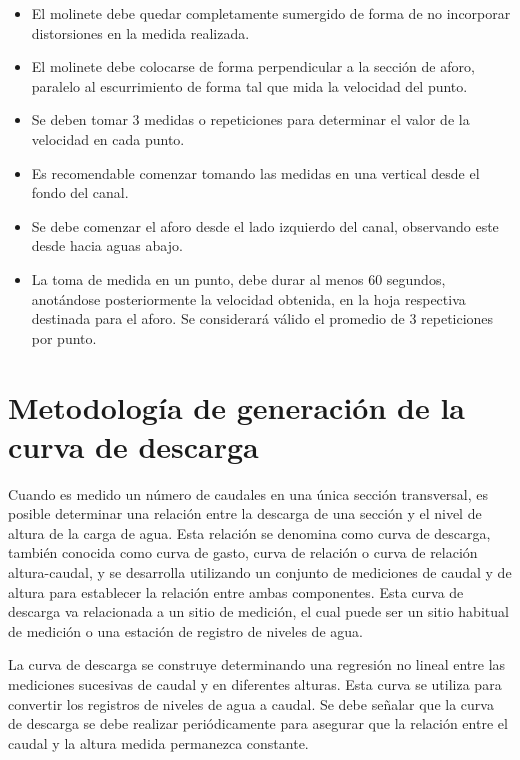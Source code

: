 \documentclass[]{article}
\providecommand{\tightlist}{%
  \setlength{\itemsep}{0pt}\setlength{\parskip}{0pt}}
\begin{document}
\begin{itemize}
\tightlist
\item
  El molinete debe quedar completamente sumergido de forma de no
  incorporar distorsiones en la medida realizada.
\item
  El molinete debe colocarse de forma perpendicular a la sección de
  aforo, paralelo al escurrimiento de forma tal que mida la velocidad
  del punto.
\item
  Se deben tomar 3 medidas o repeticiones para determinar el valor de la
  velocidad en cada punto.
\item
  Es recomendable comenzar tomando las medidas en una vertical desde el
  fondo del canal.
\item
  Se debe comenzar el aforo desde el lado izquierdo del canal,
  observando este desde hacia aguas abajo.
\item
  La toma de medida en un punto, debe durar al menos 60 segundos,
  anotándose posteriormente la velocidad obtenida, en la hoja respectiva
  destinada para el aforo. Se considerará válido el promedio de 3
  repeticiones por punto.
\end{itemize}

\section{Metodología de generación de la curva de
descarga}\label{metodologia-de-generacion-de-la-curva-de-descarga}

Cuando es medido un número de caudales en una única sección transversal,
es posible determinar una relación entre la descarga de una sección y el
nivel de altura de la carga de agua. Esta relación se denomina como
curva de descarga, también conocida como curva de gasto, curva de
relación o curva de relación altura-caudal, y se desarrolla utilizando
un conjunto de mediciones de caudal y de altura para establecer la
relación entre ambas componentes. Esta curva de descarga va relacionada
a un sitio de medición, el cual puede ser un sitio habitual de medición
o una estación de registro de niveles de agua.

La curva de descarga se construye determinando una regresión no lineal
entre las mediciones sucesivas de caudal y en diferentes alturas. Esta
curva se utiliza para convertir los registros de niveles de agua a
caudal. Se debe señalar que la curva de descarga se debe realizar
periódicamente para asegurar que la relación entre el caudal y la altura
medida permanezca constante.
\end{document}

